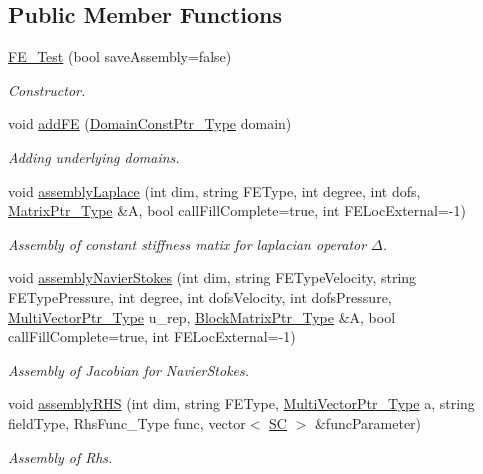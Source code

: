 \subsection*{Public Member Functions}
\begin{DoxyCompactItemize}
\item 
\hyperlink{classFEDD_1_1FE__Test_a2e9a8640f2f6ed99376efbe84298e744}{F\+E\+\_\+\+Test} (bool save\+Assembly=false)
\begin{DoxyCompactList}\small\item\em Constructor. \end{DoxyCompactList}\item 
void \hyperlink{classFEDD_1_1FE__Test_a9703f9144722f9c01e5bde489c2e6c2f}{add\+FE} (\hyperlink{classFEDD_1_1FE__Test_a0a941851908a1e68d1554f8b28a7c72a}{Domain\+Const\+Ptr\+\_\+\+Type} domain)
\begin{DoxyCompactList}\small\item\em Adding underlying domains. \end{DoxyCompactList}\item 
void \hyperlink{classFEDD_1_1FE__Test_ab547f74307b655e75629ea6717bad2a2}{assembly\+Laplace} (int dim, string F\+E\+Type, int degree, int dofs, \hyperlink{classFEDD_1_1FE__Test_a3c2e34afc3a1495c2b00313399f12b3d}{Matrix\+Ptr\+\_\+\+Type} \&A, bool call\+Fill\+Complete=true, int F\+E\+Loc\+External=-\/1)
\begin{DoxyCompactList}\small\item\em Assembly of constant stiffness matix for laplacian operator $ \Delta $. \end{DoxyCompactList}\item 
void \hyperlink{classFEDD_1_1FE__Test_afe3cadc983f9c93cc6f4c967b6bfb237}{assembly\+Navier\+Stokes} (int dim, string F\+E\+Type\+Velocity, string F\+E\+Type\+Pressure, int degree, int dofs\+Velocity, int dofs\+Pressure, \hyperlink{classFEDD_1_1FE__Test_ac7c0363aa74e0bfcb903c13330c50185}{Multi\+Vector\+Ptr\+\_\+\+Type} u\+\_\+rep, \hyperlink{classFEDD_1_1FE__Test_a2b1edc85a8fab435be53fb22b843af9d}{Block\+Matrix\+Ptr\+\_\+\+Type} \&A, bool call\+Fill\+Complete=true, int F\+E\+Loc\+External=-\/1)
\begin{DoxyCompactList}\small\item\em Assembly of Jacobian for Navier\+Stokes. \end{DoxyCompactList}\item 
void \hyperlink{classFEDD_1_1FE__Test_a262c614022e1bf4bf44cafb282494d15}{assembly\+R\+HS} (int dim, string F\+E\+Type, \hyperlink{classFEDD_1_1FE__Test_ac7c0363aa74e0bfcb903c13330c50185}{Multi\+Vector\+Ptr\+\_\+\+Type} a, string field\+Type, Rhs\+Func\+\_\+\+Type func, vector$<$ \hyperlink{fe__test__laplace_8cpp_a79c7e86a57edbb2a5a53242bcd04e41e}{SC} $>$ \&func\+Parameter)
\begin{DoxyCompactList}\small\item\em Assembly of Rhs. \end{DoxyCompactList}\end{DoxyCompactItemize}
